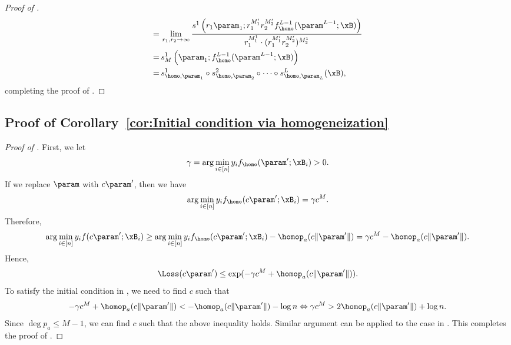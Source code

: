 \begin{proof}[Proof of ]
\begin{align*}
    = \, & \lim_{r_1, r_2 \to \infty} \frac{s^1 \left( r_1 \param_1; r_1^{M_1'} r_2^{M_2'} f_\homo^{L-1}(\param^{L-1}; \xB) \right)}{r_1^{M_1^1} \cdot (r_1^{M_1'} r_2^{M_2'})^{M_2^1}} \\
    = \, & s_M^1 \left( \param_1; f_\homo^{L-1}(\param^{L-1}; \xB) \right) \\
    = \, & s_{\homo, \param_1}^1 \circ s_{\homo, \param_2}^2 \circ \cdots \circ s_{\homo, \param_L}^L (\xB),
\end{align*}
completing the proof of .
\end{proof}



\subsection{Proof of Corollary~\ref{cor:Initial condition via homogeneization}}
\begin{proof}[Proof of ]
First, we let 
\[
\gamma = \arg\min_{i\in [n]} y_i f_{\homo}(\param^\prime ;\xB_i) >0.   
\] 
If we replace $\param$ with $c \param^\prime $, then we have 
\[
\arg\min_{i\in [n]} y_i f_{\homo}(c \param^\prime ;\xB_i) = \gamma c^M. 
\]
Therefore, 
\[
\arg\min_{i\in [n]} y_i f(c \param^\prime ;\xB_i) \ge \arg\min_{i\in [n]} y_i f_{\homo}(c \param^\prime ;\xB_i) - \homop_a(c \|\param^\prime\|) = \gamma c^M - \homop_a(c \|\param^\prime\|). 
\]
Hence, 
\[
\Loss(c\param') \le \exp( - \gamma c^M + \homop_a(c \|\param^\prime\|) ) . 
\]
To satisfy the initial condition in , we need to find $c$ such that
\[
- \gamma c^M + \homop_a(c \|\param^\prime\|) < -\homop_a(c \|\param^\prime\|) - \log n \Leftrightarrow \gamma c^M > 2  \homop_a(c \|\param^\prime\|) + \log n. 
\]
Since $\deg p_a \le M-1$, we can find $c$ such that the above inequality holds. Similar argument can be applied to the case in . This completes the proof of .
\end{proof}



